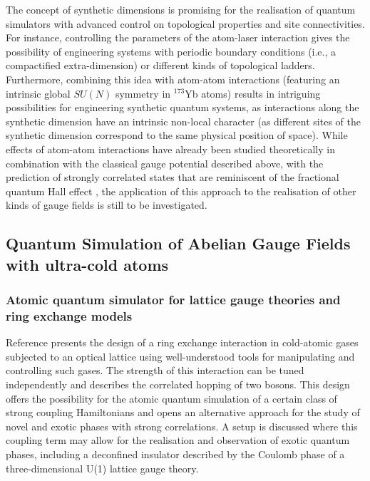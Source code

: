 \documentclass[epj,final]{svjour}
\begin{document}
The concept of synthetic dimensions is promising for the realisation of quantum simulators with advanced control on topological properties and site connectivities. For instance, controlling the parameters of the atom-laser interaction gives the possibility of engineering systems with periodic boundary conditions (i.e., a compactified extra-dimension) \cite{boada2015quantumsimulation} or different kinds of topological ladders. Furthermore, combining this idea with atom-atom interactions (featuring an intrinsic global $SU(N)$ symmetry in $^{173}$Yb atoms) results in intriguing possibilities for engineering synthetic quantum systems, as interactions along the synthetic dimension have an intrinsic non-local character (as different sites of the synthetic dimension correspond to the same physical position of space). While effects of atom-atom interactions have already been studied theoretically in combination with the classical gauge potential described above, with the prediction of strongly correlated states that are reminiscent of the fractional quantum Hall effect \cite{barbarino2015magnetic,taddia2017topological,strinati2017laughlin}, the application of this approach to the realisation of other kinds of gauge fields is still to be investigated.

\subsection{Quantum Simulation of Abelian Gauge Fields with ultra-cold atoms}

\subsubsection{Atomic quantum simulator for lattice gauge theories and ring exchange models\cite{buchler2005atomic}}

Reference \cite{buchler2005atomic} presents the design of a ring exchange interaction in cold-atomic gases subjected to an optical lattice using well-understood tools for manipulating and controlling such gases. The strength of this interaction can be tuned independently and describes the correlated hopping of two bosons. This design offers the possibility for the atomic quantum simulation of a certain class of strong coupling Hamiltonians and opens an alternative approach for the study of novel and exotic phases with strong correlations. A setup is discussed where this coupling term may allow for the realisation and observation of exotic quantum phases, including a deconfined insulator described by the Coulomb phase of a three-dimensional U(1) lattice gauge theory. 
\end{document}
